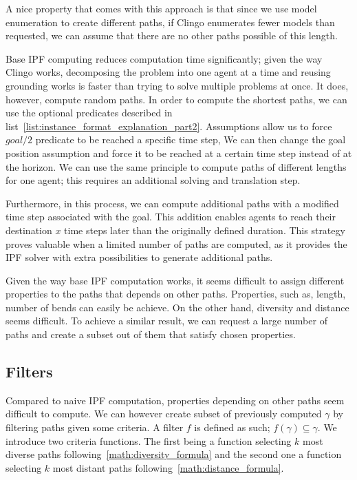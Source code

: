 A nice property that comes with this approach is that since we use model enumeration to create different paths, if Clingo enumerates fewer models than requested, we can assume that there are no other paths possible of this length.

Base IPF computing reduces computation time significantly; given the way Clingo works, decomposing the problem into one agent at a time and reusing grounding works is faster than trying to solve multiple problems at once. It does, however, compute random paths. In order to compute the shortest paths, we can use the optional predicates described in list~\ref{list:instance_format_explanation_part2}. Assumptions allow us to force \(goal/2\) predicate to be reached a specific time step,  We can then change the goal position assumption and force it to be reached at a certain time step instead of at the horizon. We can use the same principle to compute paths of different lengths for one agent; this requires an additional solving and translation step.

Furthermore, in this process, we can compute additional paths with a modified time step associated with the goal. This addition enables agents to reach their destination \(x\) time steps later than the originally defined duration. This strategy proves valuable when a limited number of paths are computed, as it provides the IPF solver with extra possibilities to generate additional paths.

Given the way base IPF computation works, it seems difficult to assign different properties to the paths that depends on other paths. Properties, such as, length, number of bends can easily be achieve. On the other hand, diversity and distance seems difficult. To achieve a similar result, we can request a large number of paths and create a subset out of them that satisfy chosen properties. 


\subsection{Filters}

Compared to naive IPF computation, properties depending on other paths seem difficult to compute. We can however create subset of previously computed \(\gamma\) by filtering paths given some criteria. A filter \(f\) is defined as such; \( f(\gamma) \subseteq \gamma \). We introduce two criteria functions. The first being a function selecting \(k\) most diverse paths following~\ref{math:diversity_formula} and the second one a function selecting \(k\) most distant paths following~\ref{math:distance_formula}.

